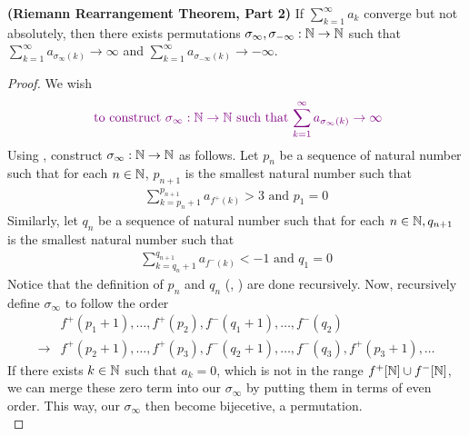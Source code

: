 \documentclass{report}
\begin{document}
\begin{theorem}
\label{t1}
\textbf{(Riemann Rearrangement Theorem, Part 2)} If $\sum_{k=1}^\infty a_k$ converge but not absolutely, then there exists permutations $\sigma_{\infty}, \sigma_{-\infty}:\mathbb{N}\rightarrow \mathbb{N}$ such that $\sum_{k=1}^\infty a_{\sigma_\infty(k)}\to\infty$ and $\sum_{k=1}^\infty a_{\sigma_{-\infty}(k)}\to-\infty$. 
\end{theorem}
\begin{proof}
We wish
\begin{align*}
\textcolor{violet}{\text{ to construct $\sigma_{\infty}:\mathbb{N}\rightarrow \mathbb{N}$ such that  $\sum_{k=1}^\infty a_{\sigma_{\infty}(k)}\to\infty$}}
\end{align*}
Using , construct $\sigma_{\infty}:\mathbb{N}\rightarrow \mathbb{N}$ as follows. Let $p_n$ be a sequence of natural number such that for each $n\in\mathbb{N}$, $p_{n+1}$ is the smallest natural number such that 
\begin{align}
\label{e10}
\sum_{k=p_n+1}^{p_{n+1}} a_{f^+(k)}> 3\text{ and }p_1=0
\end{align}
Similarly, let $q_n$ be a sequence of natural number such that for each $n\in\mathbb{N},q_{n+1}$ is the smallest natural number such that 
\begin{align}
\label{e11}
\sum_{k=q_n+1}^{q_{n+1}}a_{f^-(k)}<-1\text{ and }q_1=0
\end{align}
Notice that the definition of $p_n$ and  $q_n$ (, ) are done recursively. Now, recursively define $\sigma_{\infty}$ to follow the order
\begin{align*}
&f^+(p_1+1),\dots,f^+(p_2),f^-(q_1+1),\dots ,f^-(q_2)\\
  \longrightarrow &  f^+(p_2+1),\dots ,f^+(p_3),f^-(q_2+1),\dots ,f^-(q_3),f^+(p_3+1),\dots 
\end{align*}
If there exists  $k\in\mathbb{N}$ such that $a_k=0$, which is not in the range $f^+[\mathbb{N}]\cup f^-[\mathbb{N}]$, we can merge these zero term into our $\sigma_{\infty}$ by putting them in terms of even order. This way, our $\sigma_{\infty}$ then become bijecetive, a permutation.\\


\end{proof}
\end{document}
